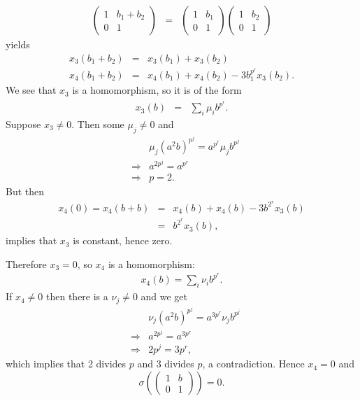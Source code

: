 \begin{example}
	\begin{eqnarray*}
		\left(\begin{matrix} 1 & b_1 + b_2 \\ 0 & 1\end{matrix}\right) &=&
		\left(\begin{matrix} 1 & b_1 \\ 0 & 1\end{matrix}\right)
		\left(\begin{matrix} 1 & b_2 \\ 0 & 1\end{matrix}\right)
	\end{eqnarray*}
	yields
	\begin{eqnarray*}
		x_3(b_1 + b_2) &=& x_3(b_1) + x_3(b_2)\\
		x_4(b_1 + b_2) &=& x_4(b_1) + x_4(b_2) - 3b_1^{p^r}x_3(b_2).
	\end{eqnarray*}
	We see that $x_3$ is a homomorphism, so it is of the form
	\begin{eqnarray*}
		x_3(b) &=& \sum_i \mu_i b^{p^i}.
	\end{eqnarray*}
	Suppose $x_3\neq 0$. Then some $\mu_j\neq 0$ and
	\begin{eqnarray*}
		&&\mu_j (a^2b)^{p^j} = a^{p^r}\mu_j b^{p^j}\\
		&\Longrightarrow& a^{2p^j} = a^{p^r}\\
		&\Longrightarrow& p = 2.
	\end{eqnarray*}
	But then
	\begin{eqnarray*}
		x_4(0) = x_4(b+b) &=& x_4(b)+x_4(b)-3b^{2^r}x_3(b)\\
		&=& b^{2^r}x_3(b),
	\end{eqnarray*}
	implies that $x_3$ is constant, hence zero. 
	
	Therefore $x_3 = 0$, so $x_4$ is a homomorphism:
	\begin{eqnarray*}
		x_4(b) = \sum_i \nu_i b^{p^r}.
	\end{eqnarray*}
	If $x_4\neq 0$ then there is a $\nu_j\neq 0$ and we get
	\begin{eqnarray*}
		&&\nu_j(a^2b)^{p^j} = a^{3p^r}\nu_j b^{p^j}\\
		&\Longrightarrow& a^{2p^j} = a^{3p^r}\\
		&\Longrightarrow& 2p^j = 3p^r,
	\end{eqnarray*}
	which implies that 2 divides $p$ and 3 divides $p$, a contradiction. Hence $x_4=0$ and
	\begin{displaymath}
		\sigma\left(\left(\begin{matrix}1 & b\\0 & 1\end{matrix}\right)\right) = 0.
	\end{displaymath}
\end{example}

